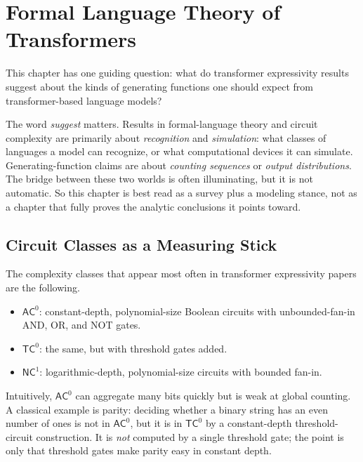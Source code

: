 \chapter{Formal Language Theory of Transformers}
\label{ch11:top}

This chapter has one guiding question: what do transformer expressivity results suggest about the kinds of generating functions one should expect from transformer-based language models?

The word \emph{suggest} matters. Results in formal-language theory and circuit complexity are primarily about \emph{recognition} and \emph{simulation}: what classes of languages a model can recognize, or what computational devices it can simulate. Generating-function claims are about \emph{counting sequences} or \emph{output distributions}. The bridge between these two worlds is often illuminating, but it is not automatic. So this chapter is best read as a survey plus a modeling stance, not as a chapter that fully proves the analytic conclusions it points toward.

\section{Circuit Classes as a Measuring Stick}

The complexity classes that appear most often in transformer expressivity papers are the following.

\begin{definition}
\begin{itemize}
  \item $\mathsf{AC}^0$: constant-depth, polynomial-size Boolean circuits with unbounded-fan-in AND, OR, and NOT gates.
  \item $\mathsf{TC}^0$: the same, but with threshold gates added.
  \item $\mathsf{NC}^1$: logarithmic-depth, polynomial-size circuits with bounded fan-in.
\end{itemize}
\end{definition}

Intuitively, $\mathsf{AC}^0$ can aggregate many bits quickly but is weak at global counting. A classical example is parity: deciding whether a binary string has an even number of ones is not in $\mathsf{AC}^0$, but it is in $\mathsf{TC}^0$ by a constant-depth threshold-circuit construction. It is \emph{not} computed by a single threshold gate; the point is only that threshold gates make parity easy in constant depth.

